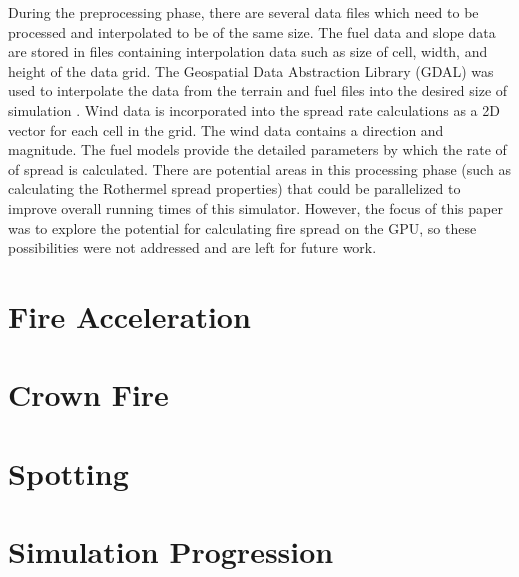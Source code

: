 During the preprocessing phase, there are several data files which need to be processed and interpolated to be of the same size. The fuel data and slope data are stored in files containing interpolation data such as size of cell, width, and height of the data grid. The Geospatial Data Abstraction Library (GDAL) was used to interpolate the data from the terrain and fuel files into the desired size of simulation \cite{GDAL}. Wind data is incorporated into the spread rate calculations as a 2D vector for each cell in the grid. The wind data contains a direction and magnitude. The fuel models provide the detailed parameters by which the rate of of spread is calculated. There are potential areas in this processing phase (such as calculating the Rothermel spread properties) that could be parallelized to improve overall running times of this simulator. However, the focus of this paper was to explore the potential for calculating fire spread on the GPU, so these possibilities were not addressed and are left for future work. 


\section{Fire Acceleration}

\section{Crown Fire}

\section{Spotting}

\section{Simulation Progression}